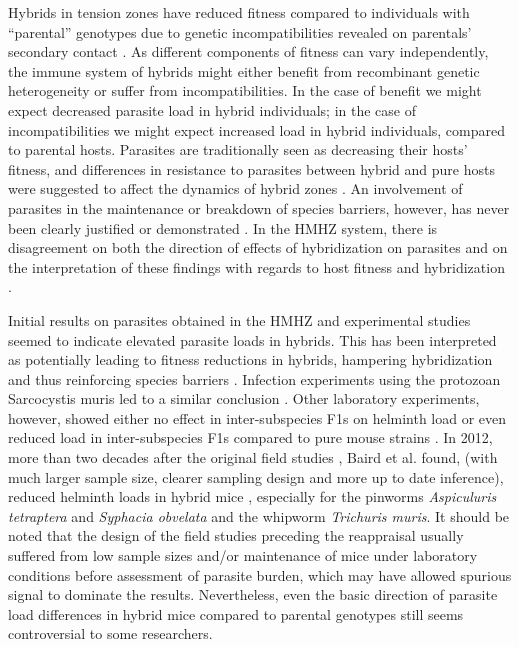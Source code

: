 \par Hybrids in tension zones have reduced fitness compared to individuals with “parental” genotypes due to genetic incompatibilities revealed on parentals’ secondary contact \citep{barton_analysis_1985}. As different components of fitness can vary independently, the immune system of hybrids might either benefit from recombinant genetic heterogeneity or suffer from incompatibilities. In the case of benefit we might expect decreased parasite load in hybrid individuals; in the case of incompatibilities we might expect increased load in hybrid individuals, compared to parental hosts. Parasites are traditionally seen as decreasing their hosts’ fitness, and differences in resistance to parasites between hybrid and pure hosts were suggested to affect the dynamics of hybrid zones \citep{fritz_resistance_1999}. An involvement of parasites in the maintenance or breakdown of species barriers, however, has never been clearly justified or demonstrated \citep{baird_shifting_2019}. In the HMHZ system, there is disagreement on both the direction of effects of hybridization on parasites \parencites[see][vs]{sage_wormy_1986, moulia_wormy_1991}{baird_where_2012} and on the interpretation of these findings with regards to host fitness and hybridization \parencites[see for example][]{theodosopoulos_parasites_2019, baird_shifting_2019}.
\par Initial results on parasites obtained in the HMHZ and experimental studies seemed to indicate elevated parasite loads in hybrids. This has been interpreted as potentially leading to fitness reductions in hybrids, hampering hybridization and thus reinforcing species barriers \citep{moulia_wormy_1991, moulia_experimental_1993, sage_wormy_1986}. Infection experiments using the protozoan Sarcocystis muris led to a similar conclusion \citep{derothe_susceptibility_2001}. Other laboratory experiments, however, showed either no effect in inter-subspecies F1s on helminth load or even reduced load in inter-subspecies F1s compared to pure mouse strains \citep{derothe_recombination_2004, moulia_hybrid_1995}. In 2012, more than two decades after the original field studies \citep{moulia_wormy_1991, sage_wormy_1986}, Baird et al. found, (with much larger sample size, clearer sampling design and more up to date inference), reduced helminth loads in hybrid mice \citep{baird_where_2012}, especially for the pinworms \textit{Aspiculuris tetraptera} and \textit{Syphacia obvelata} and the whipworm \textit{Trichuris muris}. It should be noted that the design of the field studies preceding the \cite{baird_where_2012} reappraisal usually suffered from low sample sizes and/or maintenance of mice under laboratory conditions before assessment of parasite burden, which may have allowed spurious signal to dominate the results. Nevertheless, even the basic direction of parasite load differences in hybrid mice compared to parental genotypes still seems controversial to some researchers. 
